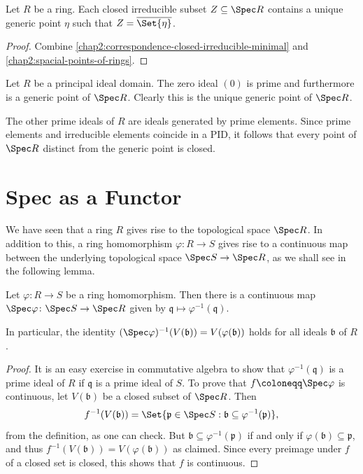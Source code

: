 \begin{corollary}\label{chap2:closed-irreducible-subset-of-affine-has-unique-generic-point}
	Let $R$ be a ring. Each closed irreducible subset $Z \subseteq \Spec R$ contains a unique generic point $\eta$ such that $Z = \overline{\Set{\eta}}$.
\end{corollary}
\begin{proof}
	Combine \cref{chap2:correspondence-closed-irreducible-minimal} and \cref{chap2:spacial-points-of-rings}.
\end{proof}

\begin{example}
	Let $R$ be a principal ideal domain. The zero ideal $(0)$ is prime and furthermore is a generic point of $\Spec R$. Clearly this is the unique generic point of $\Spec R$.
	
	The other prime ideals of $R$ are ideals generated by prime elements. Since prime elements and irreducible elements coincide in a PID, it follows that every point of $\Spec R$ distinct from the generic point is closed.
\end{example}

\section{Spec as a Functor}

We have seen that a ring $R$ gives rise to the topological space $\Spec R$. In addition to this, a ring homomorphism $\varphi \colon R \to S$ gives rise to a continuous map between the underlying topological space $\Spec S \to \Spec R$, as we shall see in the following lemma.

\begin{lemma}\label{chap2:spec-map-is-continuous}
	Let $\varphi \colon R \to S$ be a ring homomorphism. Then there is a continuous map $\Spec \varphi \colon \Spec S \to \Spec R$ given by $\mathfrak{q}  \mapsto \varphi^{-1}(\mathfrak{q})$. 
	
	In particular, the identity $(\Spec \varphi)^{-1}(V(\mathfrak{b})) = V(\varphi(\mathfrak{b}))$ holds for all ideals $\mathfrak{b}$ of $R$.
\end{lemma}
\begin{proof}
	It is an easy exercise in commutative algebra to show that $\varphi^{-1}(\mathfrak{q})$ is a prime ideal of $R$ if $\mathfrak{q}$ is a prime ideal of $S$. To prove that $f \coloneqq \Spec \varphi$ is continuous, let $V(\mathfrak{b})$ be a closed subset of $\Spec R$. Then
	\begin{equation*}
		f^{-1}(V(\mathfrak{b})) = \Set{\mathfrak{p} \in \Spec S : \mathfrak{b} \subseteq \varphi^{-1}(\mathfrak{p}) },
	\end{equation*}
	from the definition, as one can check. But $\mathfrak{b} \subseteq \varphi^{-1}(\mathfrak{p})$ if and only if $\varphi(\mathfrak{b}) \subseteq \mathfrak{p}$, and thus $f^{-1}(V(\mathfrak{b})) = V(\varphi(\mathfrak{b}))$ as claimed. Since every preimage under $f$ of a closed set is closed, this shows that $f$ is continuous.
\end{proof}

